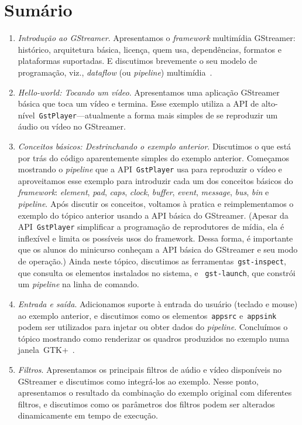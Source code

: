 \documentclass{SBCbookchapter}
\begin{document}
\section{Sumário}
\begin{enumerate}
\item\emph{Introdução ao GStreamer}.  Apresentamos o \emph{framework}
  multimídia GStreamer: histórico, arquitetura básica, licença, quem usa,
  dependências, formatos e plataformas suportadas.  E discutimos brevemente
  o seu modelo de programação, viz., \emph{dataflow} (ou \emph{pipeline})
  multimídia~\cite{?}.

\item\emph{Hello-world: Tocando um vídeo}.  Apresentamos uma aplicação
  GStreamer básica que toca um vídeo e termina.  Esse exemplo utiliza a API
  de alto-nível~\texttt{GstPlayer}---atualmente a forma mais simples de se
  reproduzir um áudio ou vídeo no GStreamer.

\item\emph{Conceitos básicos: Destrinchando o exemplo anterior}.  Discutimos
  o que está por trás do código aparentemente simples do exemplo anterior.
  Começamos mostrando o \emph{pipeline} que a API~\texttt{GstPlayer} usa
  para reproduzir o vídeo e aproveitamos esse exemplo para introduzir cada
  um dos conceitos básicos do \emph{framework}:  \emph{element}, \emph{pad},
  \emph{caps}, \emph{clock}, \emph{buffer}, \emph{event}, \emph{message},
  \emph{bus}, \emph{bin} e \emph{pipeline}.  Após discutir os conceitos,
  voltamos à pratica e reimplementamos o exemplo do tópico anterior usando a
  API básica do GStreamer.  (Apesar da API~\texttt{GstPlayer} simplificar a
  programação de reprodutores de mídia, ela é inflexível e limita os
  possíveis usos do framework.  Dessa forma, é importante que os alunos do
  minicurso conheçam a API básica do GStreamer e seu modo de operação.)
  Ainda neste tópico, discutimos as ferramentas~\texttt{gst-inspect}, que
  consulta os elementos instalados no sistema, e ~\texttt{gst-launch}, que
  constrói um \emph{pipeline} na linha de comando.

\item\emph{Entrada e saída}.  Adicionamos suporte à entrada do usuário
  (teclado e mouse) ao exemplo anterior, e discutimos como os
  elementos~\texttt{appsrc} e~\texttt{appsink} podem ser utilizados para
  injetar ou obter dados do \emph{pipeline}.  Concluímos o tópico mostrando
  como renderizar os quadros produzidos no exemplo numa
  janela~GTK+~\cite{?}.

\item\emph{Filtros}.  Apresentamos os principais filtros de aúdio e vídeo
  disponíveis no GStreamer e discutimos como integrá-los ao exemplo.  Nesse
  ponto, apresentamos o resultado da combinação do exemplo original com
  diferentes filtros, e discutimos como os parâmetros dos filtros podem ser
  alterados dinamicamente em tempo de execução.


\end{enumerate}
\end{document}
